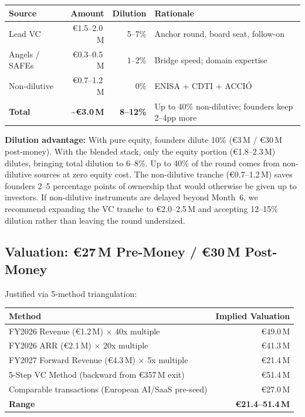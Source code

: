 \documentclass[11pt,a4paper]{article}
\begin{document}
\vspace{-2pt}
\begin{table}[h!]
\centering
\small
\begin{tabularx}{\textwidth}{Xrrp{5.2cm}}
\toprule
\textbf{Source} & \textbf{Amount} & \textbf{Dilution} & \textbf{Rationale} \\
\midrule
Lead VC & \euro{}1.5--2.0\,M & 5--7\% & Anchor round, board seat, follow-on \\
Angels / SAFEs & \euro{}0.3--0.5\,M & 1--2\% & Bridge speed; domain expertise \\
Non-dilutive & \euro{}0.7--1.2\,M & 0\% & ENISA + CDTI + ACCI\'O \\
\midrule
\textbf{Total} & \textbf{\textasciitilde\euro{}3.0\,M} & \textbf{8--12\%} & Up to 40\% non-dilutive; founders keep 2--4pp more \\
\bottomrule
\end{tabularx}
\end{table}
\vspace{-4pt}

\textbf{Dilution advantage:} With pure equity, founders dilute 10\% (\euro{}3\,M / \euro{}30\,M post-money). With the blended stack, only the equity portion (\euro{}1.8--2.3\,M) dilutes, bringing total dilution to 6--8\%. Up to 40\% of the round comes from non-dilutive sources at zero equity cost. The non-dilutive tranche (\euro{}0.7--1.2\,M) saves founders 2--5 percentage points of ownership that would otherwise be given up to investors. If non-dilutive instruments are delayed beyond Month~6, we recommend expanding the VC tranche to \euro{}2.0--2.5\,M and accepting 12--15\% dilution rather than leaving the round undersized.

\subsection{Valuation: \euro{}27\,M Pre-Money / \euro{}30\,M Post-Money}

Justified via 5-method triangulation:

\vspace{-2pt}
\begin{table}[h!]
\centering
\small
\begin{tabularx}{\textwidth}{Xr}
\toprule
\textbf{Method} & \textbf{Implied Valuation} \\
\midrule
FY2026 Revenue (\euro{}1.2\,M) $\times$ 40x multiple & \euro{}49.0\,M \\
FY2026 ARR (\euro{}2.1\,M) $\times$ 20x multiple & \euro{}41.3\,M \\
FY2027 Forward Revenue (\euro{}4.3\,M) $\times$ 5x multiple & \euro{}21.4\,M \\
5-Step VC Method (backward from \euro{}357\,M exit) & \euro{}51.4\,M \\
Comparable transactions (European AI/SaaS pre-seed) & \euro{}27.0\,M \\
\midrule
\textbf{Range} & \textbf{\euro{}21.4--51.4\,M} \\
\bottomrule
\end{tabularx}
\end{table}
\vspace{-4pt}
\end{document}
